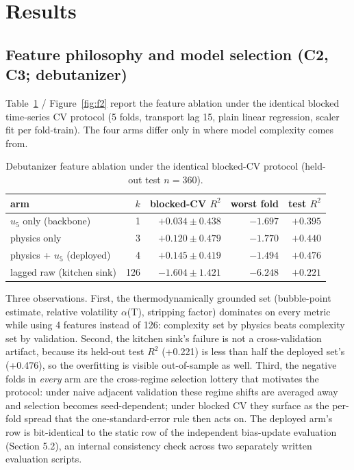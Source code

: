 \section{Results}
\label{sec:results}

\subsection{Feature philosophy and model selection (C2, C3; debutanizer)}

Table~\ref{tab:t1} / Figure~\ref{fig:f2} report the feature ablation under the identical blocked
time-series CV protocol (5 folds, transport lag 15, plain linear regression, scaler fit
per fold-train). The four arms differ only in where model complexity comes from.


\begin{table}[t]
\centering\small
\caption{Debutanizer feature ablation under the identical blocked-CV protocol (held-out test $n=360$).}
\label{tab:t1}
\begin{tabular}{@{}lrrrr@{}}
\toprule
arm & $k$ & blocked-CV $R^2$ & worst fold & test $R^2$ \\
\midrule
$u_5$ only (backbone) & 1 & $+0.034 \pm 0.438$ & $-1.697$ & $+0.395$ \\
physics only & 3 & $+0.120 \pm 0.479$ & $-1.770$ & $+0.440$ \\
physics + $u_5$ (deployed) & 4 & $\mathbf{+0.145 \pm 0.419}$ & $-1.494$ & $\mathbf{+0.476}$ \\
lagged raw (kitchen sink) & 126 & $-1.604 \pm 1.421$ & $-6.248$ & $+0.221$ \\
\bottomrule
\end{tabular}
\end{table}

Three observations. First, the thermodynamically grounded set (bubble-point estimate,
relative volatility $\alpha$(T), stripping factor) dominates on every metric while using 4
features instead of 126: complexity set by physics beats complexity set by validation.
Second, the kitchen sink's failure is not a cross-validation artifact, because its held-out
test $R^2$ (+0.221) is less than half the deployed set's (+0.476), so the overfitting is
visible out-of-sample as well. Third, the negative folds in \emph{every} arm are the
cross-regime selection lottery that motivates the protocol: under naive adjacent
validation these regime shifts are averaged away and selection becomes seed-dependent;
under blocked CV they surface as the per-fold spread that the one-standard-error rule
then acts on. The deployed arm's row is bit-identical to the static row of the
independent bias-update evaluation (Section 5.2), an internal consistency check across
two separately written evaluation scripts.

